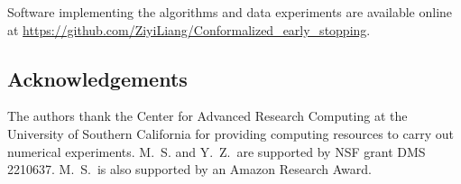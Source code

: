 Software implementing the algorithms and data experiments are available online at \url{https://github.com/ZiyiLiang/Conformalized_early_stopping}.


\subsection*{Acknowledgements}
The authors thank the Center for Advanced Research Computing at the University of Southern California for providing computing resources to carry out numerical experiments.
M.~S. and Y.~Z.~are supported by NSF grant DMS 2210637.
M.~S.~is also supported by an Amazon Research Award. 


